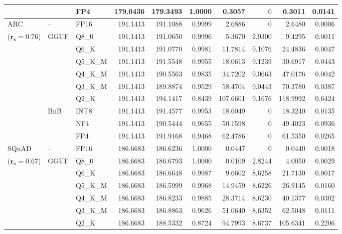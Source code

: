\begin{longtable}{ll l rrrrrrr}
 &  & FP4 & 179.0436 & 179.3493 & 1.0000 & 0.3057 & \cellcolor{cyan!12} $0$ & 0.3011 & 0.0141 \\
\midrule
ARC & -- & FP16 & 191.1413 & 191.1088 & 0.9999 & 2.6886 & \cellcolor{cyan!12} $0$ & 2.6480 & 0.0006 \\
{\small ($\mathbf{r_s{=}0.76}$)} & GGUF & Q8\_0 & 191.1413 & 191.0650 & 0.9996 & 5.3670 & 2.9300 & 9.4295 & 0.0011 \\
 &  & Q6\_K & 191.1413 & 191.0770 & 0.9981 & 11.7814 & 9.1076 & 24.4836 & 0.0047 \\
 &  & Q5\_K\_M & 191.1413 & 191.5548 & 0.9955 & 18.0613 & 9.1239 & 30.6917 & 0.0443 \\
 &  & Q4\_K\_M & 191.1413 & 190.5563 & 0.9835 & 34.7202 & 9.0663 & 47.0176 & 0.0042 \\
 &  & Q3\_K\_M & 191.1413 & 189.8874 & 0.9529 & 58.4704 & 9.0443 & 70.3780 & 0.0387 \\
 &  & Q2\_K & 191.1413 & 194.1417 & \cellcolor{red!18} 0.8439 & \cellcolor{red!18} 107.6601 & 9.1676 & \cellcolor{red!18} 118.9992 & \cellcolor{red!18} 0.6424 \\
 & BnB & INT8 & 191.1413 & 191.4577 & 0.9953 & 18.6049 & \cellcolor{cyan!12} $0$ & 18.3240 & 0.0135 \\
 &  & NF4 & 191.1413 & 190.5444 & 0.9655 & 50.1598 & \cellcolor{cyan!12} $0$ & 49.4023 & 0.0936 \\
 &  & FP4 & 191.1413 & 191.9168 & \cellcolor{red!18} 0.9468 & \cellcolor{red!18} 62.4786 & \cellcolor{cyan!12} $0$ & \cellcolor{red!18} 61.5350 & \cellcolor{red!18} 0.0265 \\
\midrule
SQuAD & -- & FP16 & 186.6683 & 186.6236 & 1.0000 & 0.0447 & \cellcolor{cyan!12} $0$ & 0.0440 & 0.0018 \\
{\small ($\mathbf{r_s{=}0.67}$)} & GGUF & Q8\_0 & 186.6683 & 186.6793 & 1.0000 & 0.0109 & 2.8244 & 4.0050 & 0.0029 \\
 &  & Q6\_K & 186.6683 & 186.6648 & 0.9987 & 9.6602 & 8.6258 & 21.7130 & 0.0017 \\
 &  & Q5\_K\_M & 186.6683 & 186.5999 & 0.9968 & 14.9459 & 8.6226 & 26.9145 & 0.0160 \\
 &  & Q4\_K\_M & 186.6683 & 186.8233 & 0.9885 & 28.3714 & 8.6230 & 40.1377 & 0.0302 \\
 &  & Q3\_K\_M & 186.6683 & 186.8863 & 0.9626 & 51.0640 & 8.6352 & 62.5048 & 0.0111 \\
 &  & Q2\_K & 186.6683 & 188.5332 & \cellcolor{red!18} 0.8724 & \cellcolor{red!18} 94.7993 & 8.6737 & \cellcolor{red!18} 105.6341 & \cellcolor{red!18} 0.2206 \\

\end{longtable}
